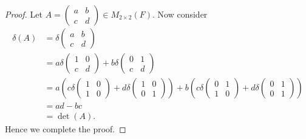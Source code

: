 \begin{Exercise}
\begin{proof}
		Let $A = \begin{pmatrix}
		a & b \\
		c & d
		\end{pmatrix}\in M_{2\times 2}(F)$. Now consider
		\begin{align*}
		\delta(A)
		&= \delta\begin{pmatrix}
		a & b \\
		c & d
		\end{pmatrix} \\
		&= a\delta\begin{pmatrix}
		1 & 0 \\
		c & d
		\end{pmatrix} + b\delta\begin{pmatrix}
		0 & 1 \\
		c & d
		\end{pmatrix} \\
		&= a\left(c\delta\begin{pmatrix}
		1 & 0 \\
		1 & 0
		\end{pmatrix} + d\delta\begin{pmatrix}
		1 & 0 \\
		0 & 1
		\end{pmatrix}\right) + b\left( c\delta\begin{pmatrix}
		0 & 1 \\
		1 & 0
		\end{pmatrix} + d\delta\begin{pmatrix}
		0 & 1 \\
		0 & 1
		\end{pmatrix}\right) \\
		&= a d - b c \\
		&= \det(A).
		\end{align*}
		Hence we complete the proof.
	\end{proof}
\end{Exercise}